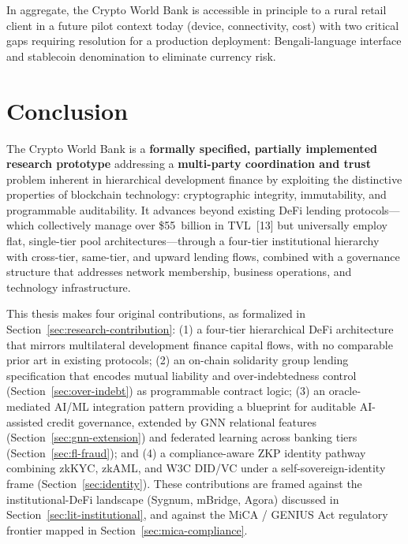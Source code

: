 \documentclass[12pt,a4paper]{report}
\begin{document}
In aggregate, the Crypto World Bank is accessible in principle to a rural retail client in a future pilot context today (device, connectivity, cost) with two critical gaps requiring resolution for a production deployment: Bengali-language interface and stablecoin denomination to eliminate currency risk.


\chapter{Conclusion}

The Crypto World Bank is a \textbf{formally specified, partially implemented research prototype} addressing a \textbf{multi-party coordination and trust} problem inherent in hierarchical development finance by exploiting the distinctive properties of blockchain technology: cryptographic integrity, immutability, and programmable auditability. It advances beyond existing DeFi lending protocols---which collectively manage over \$55~billion in TVL~[13] but universally employ flat, single-tier pool architectures---through a four-tier institutional hierarchy with cross-tier, same-tier, and upward lending flows, combined with a governance structure that addresses network membership, business operations, and technology infrastructure.

This thesis makes four original contributions, as formalized in Section~\ref{sec:research-contribution}: (1) a four-tier hierarchical DeFi architecture that mirrors multilateral development finance capital flows, with no comparable prior art in existing protocols; (2) an on-chain solidarity group lending specification that encodes mutual liability and over-indebtedness control (Section~\ref{sec:over-indebt}) as programmable contract logic; (3) an oracle-mediated AI/ML integration pattern providing a blueprint for auditable AI-assisted credit governance, extended by GNN relational features (Section~\ref{sec:gnn-extension}) and federated learning across banking tiers (Section~\ref{sec:fl-fraud}); and (4) a compliance-aware ZKP identity pathway combining zkKYC, zkAML, and W3C DID/VC under a self-sovereign-identity frame (Section~\ref{sec:identity}). These contributions are framed against the institutional-DeFi landscape (Sygnum, mBridge, Agora) discussed in Section~\ref{sec:lit-institutional}, and against the MiCA / GENIUS Act regulatory frontier mapped in Section~\ref{sec:mica-compliance}.
\end{document}
